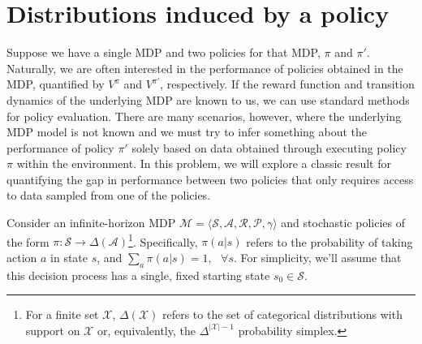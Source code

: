 \section{Distributions induced by a policy}

Suppose we have a single MDP and two policies for that MDP, $\pi$ and $\pi'$. Naturally, we are often interested in the performance of policies obtained in the MDP, quantified by $V^{\pi}$ and $V^{\pi'}$, respectively. If the reward function and transition dynamics of the underlying MDP are known to us, we can use standard methods for policy evaluation. There are many scenarios, however, where the underlying MDP model is not known and we must try to infer something about the performance of policy $\pi'$ solely based on data obtained through executing policy $\pi$ within the environment. In this problem, we will explore a classic result for quantifying the gap in performance between two policies that only requires access to data sampled from one of the policies. 

Consider an infinite-horizon MDP $\mathcal{M} = \langle \mathcal{S}, \mathcal{A}, \mathcal{R}, \mathcal{P}, \gamma \rangle$ and stochastic policies of the form $\pi: \mathcal{S} \rightarrow \Delta(\mathcal{A})$\footnote{For a finite set $\mathcal{X}$, $\Delta(\mathcal{X})$ refers to the set of categorical distributions with support on $\mathcal{X}$ or, equivalently, the $\Delta^{|\mathcal{X}|-1}$ probability simplex.}. Specifically, $\pi(a|s)$ refers to the probability of taking action $a$ in state $s$, and $\sum_a \pi(a|s) = 1, \text{ } \forall s$. For simplicity, we'll assume that this decision process has a single, fixed starting state $s_{0} \in \mathcal{S}$. 


\begin{enumerate}[(a)]

	

	

	

	

\end{enumerate}